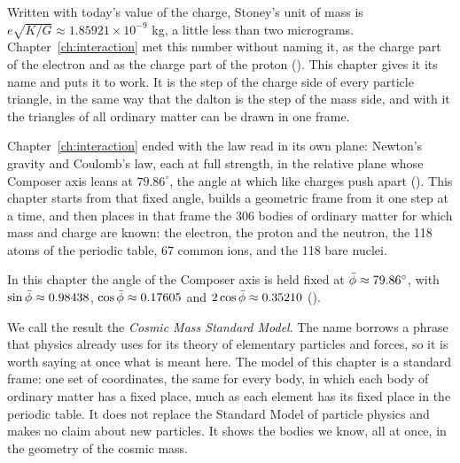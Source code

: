 Written with today's value of the charge, Stoney's unit of mass is $e\sqrt{K/G} \approx 1.85921 \times 10^{-9}$ kg, a little less than two micrograms. Chapter~\ref{ch:interaction} met this number without naming it, as the charge part of the electron and as the charge part of the proton (). This chapter gives it its name and puts it to work. It is the step of the charge side of every particle triangle, in the same way that the dalton is the step of the mass side, and with it the triangles of all ordinary matter can be drawn in one frame.

\bigskip

Chapter~\ref{ch:interaction} ended with the law read in its own plane: Newton's gravity and Coulomb's law, each at full strength, in the relative plane whose Composer axis leans at $79.86^\circ$, the angle at which like charges push apart (). This chapter starts from that fixed angle, builds a geometric frame from it one step at a time, and then places in that frame the 306 bodies of ordinary matter for which mass and charge are known: the electron, the proton and the neutron, the 118 atoms of the periodic table, 67 common ions, and the 118 bare nuclei.

\begin{remark}\label{rem:sm-fixed-angle}
In this chapter the angle of the Composer axis is held fixed at $\bar{\phi} \approx 79.86^\circ$, with $\sin\bar{\phi} \approx 0.98438$, $\cos\bar{\phi} \approx 0.17605$ and $2\cos\bar{\phi} \approx 0.35210$ ().
\end{remark}

We call the result the \emph{Cosmic Mass Standard Model}. The name borrows a phrase that physics already uses for its theory of elementary particles and forces, so it is worth saying at once what is meant here. The model of this chapter is a standard frame: one set of coordinates, the same for every body, in which each body of ordinary matter has a fixed place, much as each element has its fixed place in the periodic table. It does not replace the Standard Model of particle physics and makes no claim about new particles. It shows the bodies we know, all at once, in the geometry of the cosmic mass.

